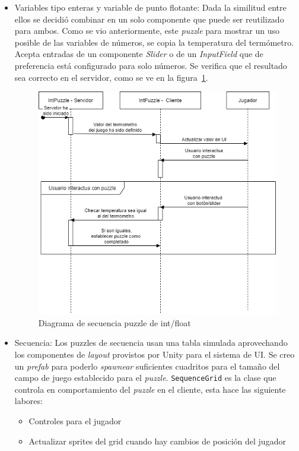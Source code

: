 \begin{itemize}
    \item Variables tipo enteras y variable de punto flotante: Dada la similitud entre ellos se decidió combinar en un solo componente que puede ser reutilizado para ambos. Como se vio anteriormente, este \textit{puzzle} para mostrar un uso posible de las variables de números, se copia la temperatura del termómetro. Acepta entradas de un componente \textit{Slider} o de un \textit{InputField} que de preferencia está configurado para solo números. Se verifica que el resultado sea correcto en el servidor, como se ve en la figura~\ref{fig:diagrama_sec_int_float}.
    \begin{figure}[H]
        \centering
        \includegraphics[width=0.8\linewidth]{images/DiagramaSecuenciaPuzzleNumbers.png}
        \caption{Diagrama de secuencia puzzle de int/float}
        \label{fig:diagrama_sec_int_float}
    \end{figure}
    \item Secuencia: Los puzzles de secuencia usan una tabla simulada aprovechando los componentes de \textit{layout} provistos por Unity para el sistema de UI. Se creo un \textit{prefab} para poderlo \textit{spawnear} suficientes cuadritos para el tamaño del campo de juego establecido para el \textit{puzzle}. \texttt{SequenceGrid} es la clase que controla en comportamiento del \textit{puzzle} en el cliente, esta hace las siguiente labores:
    \begin{itemize}
        \item Controles para el jugador
        \item Actualizar sprites del grid cuando hay cambios de posición del jugador

\end{itemize}
\end{itemize}
